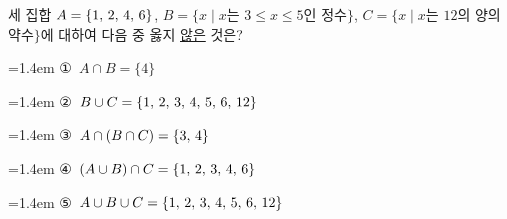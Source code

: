 세 집합 $A=\{1,\mkern3mu 2,\mkern3mu 4,\mkern3mu 6\}$, $B=\{x \mid x$는 $3\le x\le 5$인 정수$\}$, $C=\{x \mid x$는 $12$의 양의 약수$\}$에 대하여 다음 중 옳지 \underline{않은} 것은?
\par\medskip\par\noindent\hangindent=1.4em {\small ①}\ $A\cap B=\{4\}$\par\noindent\hangindent=1.4em {\small ②}\ $B\cup C=\{1,\mkern3mu 2,\mkern3mu 3,\mkern3mu 4,\mkern3mu 5,\mkern3mu 6,\mkern3mu 12\}$\par\noindent\hangindent=1.4em {\small ③}\ $A\cap(B\cap C)=\{3,\mkern3mu 4\}$\par\noindent\hangindent=1.4em {\small ④}\ $(A\cup B)\cap C=\{1,\mkern3mu 2,\mkern3mu 3,\mkern3mu 4,\mkern3mu 6\}$\par\noindent\hangindent=1.4em {\small ⑤}\ $A\cup B\cup C=\{1,\mkern3mu 2,\mkern3mu 3,\mkern3mu 4,\mkern3mu 5,\mkern3mu 6,\mkern3mu 12\}$\par\medskip
